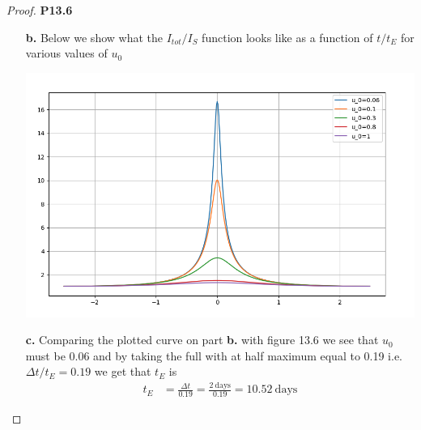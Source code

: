 \documentclass[11pt]{article}
\theoremstyle{definition}
\begin{document}
\begin{proof}{\textbf{P13.6}}
\begin{itemize}
\cleardoublepage
\item [\textbf{b.}] Below we show what the $I_{tot}/I_S$ function looks like as
a function of $t/t_E$ for various values of $u_0$
\begin{center}
    \includegraphics[scale=0.4]{ch13-p13.6.png}
\end{center}

\item [\textbf{c.}] Comparing the plotted curve on part \textbf{b.} with figure
13.6 we see that $u_0$ must be 0.06 and by taking the full with at half maximum
equal to 0.19 i.e. $\Delta t/t_E = 0.19$ we get that $t_E$ is
\begin{align*}
    t_E &= \frac{\Delta t}{0.19} =
    \frac{2~\text{days}}{0.19} = 10.52~\text{days}
\end{align*}
\end{itemize}
\end{proof}
\end{document}
